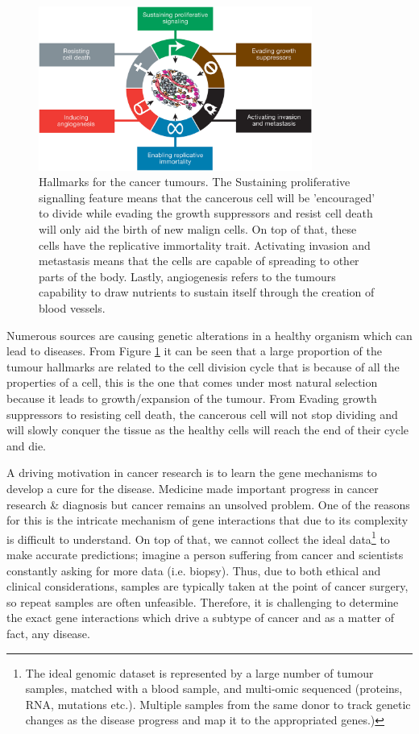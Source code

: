 \begin{figure}[!ht]
  \centering\includegraphics[width=0.8\textwidth,height=0.8\textheight,keepaspectratio]{Images/TCGA/tumour_causes}
    \caption{Hallmarks for the cancer tumours\cite{Hanahan2011-px}. The Sustaining proliferative signalling feature means that the cancerous cell will be 'encouraged' to divide while evading the growth suppressors and resist cell death will only aid the birth of new malign cells. On top of that, these cells have the replicative immortality trait. Activating invasion and metastasis means that the cells are capable of spreading to other parts of the body. Lastly, angiogenesis refers to the tumours capability to draw nutrients to sustain itself through the creation of blood vessels. }
    \label{fig:hallmarks_cancer}
\end{figure}

Numerous sources are causing genetic alterations in a healthy organism which can lead to diseases. From Figure \ref{fig:hallmarks_cancer} it can be seen that a large proportion of the tumour hallmarks are related to the cell division cycle that is because of all the properties of a cell, this is the one that comes under most natural selection because it leads to growth/expansion of the tumour. From Evading growth suppressors to resisting cell death, the cancerous cell will not stop dividing and will slowly conquer the tissue as the healthy cells will reach the end of their cycle and die.

A driving motivation in cancer research is to learn the gene mechanisms to develop a cure for the disease. Medicine made important progress in cancer research \& diagnosis but cancer remains an unsolved problem. One of the reasons for this is the intricate mechanism of gene interactions that due to its complexity is difficult to understand. On top of that, we cannot collect the ideal data\footnote{The ideal genomic dataset is represented by a large number of tumour samples, matched with a blood sample, and multi-omic sequenced (proteins, RNA, mutations etc.). Multiple samples from the same donor to track genetic changes as the disease progress and map it to the appropriated genes.)} to make accurate predictions; imagine a person suffering from cancer and scientists constantly asking for more data (i.e. biopsy). Thus, due to both ethical and clinical considerations, samples are typically taken at the point of cancer surgery, so repeat samples are often unfeasible. Therefore, it is challenging to determine the exact gene interactions which drive a subtype of cancer and as a matter of fact, any disease. 

